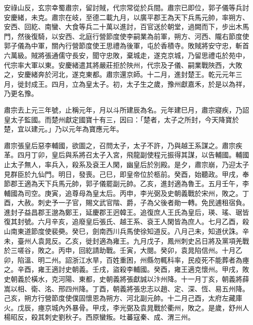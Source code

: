 \begin{pinyinscope}
 安祿山反，玄宗幸蜀肅宗，留討賊，代宗常從於兵間。肅宗已即位，郭子儀等兵討安慶緒，未克。肅宗在岐，至德二載九月，以廣平郡王為天下兵馬元帥，率朔方、安西、回紇、南蠻、大食等兵二十萬以進討，百官送於朝堂，過闕而下，步出木馬門，然後復騎，以安西、北庭行營節度使李嗣業為前軍，朔方、河西、隴右節度使郭子儀為中軍，關內行營節度使王思禮為後軍，屯於香積寺。敗賊將安守忠，斬首六萬級。賊將張通儒守長安，聞守忠敗，棄城走，遂克京城，乃留思禮屯於苑中，代宗率大軍以東。安慶緒遣其將嚴莊拒於陜州，代宗及子儀、嗣業戰陜西，大敗之，安慶緒奔於河北，遂克東都。肅宗還京師。十二月，進封楚王。乾元元年三月，徙封成王。四月，立為皇太子。初，太子生之歲，豫州獻嘉禾，於是以為祥，乃更名豫。



 肅宗去上元三年號，止稱元年，月以斗所建辰為名。元年建巳月，肅宗寢疾，乃詔皇太子監國。而楚州獻定國寶十有三，因曰：「楚者，太子之所封，今天降寶於楚，宜以建元。」乃以元年為寶應元年。



 肅宗張皇后惡李輔國，欲圖之，召問太子，太子不許，乃與越王系謀之。肅宗疾革。四月丁卯，皇后與系將召太子入宮，飛龍副使程元振得其謀，以告輔國。輔國止太子無人，率兵入，殺系及袞王人閑，幽皇后於別殿。是夕，肅宗崩，乃迎太子見群臣於九仙門。明日，發喪。己巳，即皇帝位於柩前。癸酉，始聽政。甲戌，奉節郡王適為天下兵馬元帥，郭子儀罷副元帥。乙亥，進封適為魯王。五月壬午，李輔國為司空。庚寅，追尊母為皇太后。丙申，李光弼及史朝義戰於宋州，敗之。丁酉，大赦。刺史予一子官，賜文武官階、爵，子為父後者勛一轉。免民逋租宿負。進封子益昌郡王邈為鄭王，延慶郡王迥韓王。追復庶人王氏為皇后，瑛、瑤、琚皆復其封號。六月辛亥，追廢皇后張氏、越王系、袞王人閑皆為庶人。七月乙酉，殺山南東道節度使裴奰。癸巳，劍南西川兵馬使徐知道反。八月己未，知道伏誅。辛未，臺州人袁晁反。乙亥，徙封適為雍王。九月戊子，鳳州刺史呂日將及黨項羌戰於三嗟谷，敗之。丙申，回紇請助戰。壬寅，大閱。癸卯，袁晁陷信州。十月乙卯，陷溫、明二州。詔浙江水旱，百姓重困，州縣勿輒科率，民疫死不能葬者為瘞之。辛酉，雍王適討史朝義。壬戌，盜殺李輔國。癸酉，雍王適克懷州。甲戌，敗史朝義於橫水，克河陽、東都，史朝義將張獻誠以汴州降。十一月丁亥，朝義將薛嵩以相、衛、洺、邢四州降。丁酉，朝義將張忠志以趙、定、深、恆、易五州降。己亥，朔方行營節度使僕固懷恩為朔方、河北副元帥。十二月己酉，太府左藏庫火。戊辰，瘞京城內外暴骨。甲戌，李光弼及袁晁戰於衢州，敗之。是歲，舒州人楊昭反，殺其刺史劉秋子。西原蠻叛。吐蕃寇秦、成、渭三州。




\end{pinyinscope}
